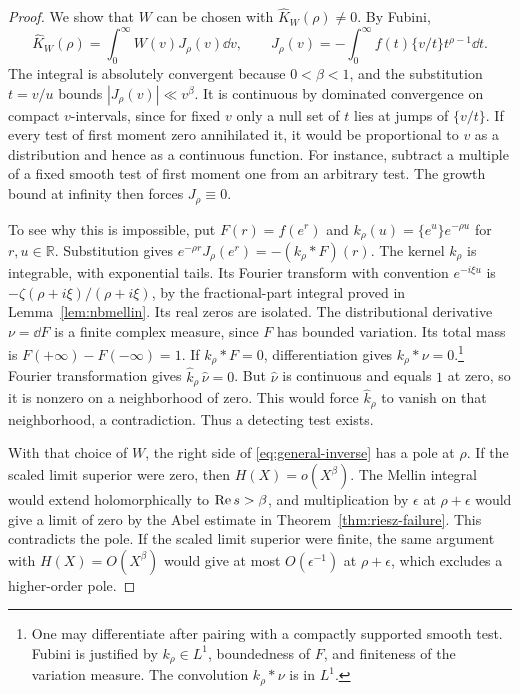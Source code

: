 \begin{proof}
We show that \(W\) can be chosen with \(\widehat K_W(\rho)\ne0\). By Fubini,
\[
 \widehat K_W(\rho)=\int_0^\infty W(v)J_\rho(v)\dd v,\qquad
 J_\rho(v)=-\int_0^\infty f(t)\{v/t\}t^{\rho-1}\dd t .
\]
The integral is absolutely convergent because \(0<\beta<1\), and the substitution \(t=v/u\) bounds \(|J_\rho(v)|\ll v^\beta\). It is continuous by dominated convergence on compact \(v\)-intervals, since for fixed \(v\) only a null set of \(t\) lies at jumps of \(\{v/t\}\). If every test of first moment zero annihilated it, it would be proportional to \(v\) as a distribution and hence as a continuous function. For instance, subtract a multiple of a fixed smooth test of first moment one from an arbitrary test. The growth bound at infinity then forces \(J_\rho\equiv0\).

To see why this is impossible, put \(F(r)=f(e^r)\) and \(k_\rho(u)=\{e^u\}e^{-\rho u}\) for \(r,u\in\mathbb R\). Substitution gives \(e^{-\rho r}J_\rho(e^r)=-(k_\rho*F)(r)\). The kernel \(k_\rho\) is integrable, with exponential tails. Its Fourier transform with convention \(e^{-i\xi u}\) is \(-\zeta(\rho+i\xi)/(\rho+i\xi)\), by the fractional-part integral proved in Lemma~\ref{lem:nbmellin}. Its real zeros are isolated. The distributional derivative \(\nu=\dd F\) is a finite complex measure, since \(F\) has bounded variation. Its total mass is \(F(+\infty)-F(-\infty)=1\). If \(k_\rho*F=0\), differentiation gives \(k_\rho*\nu=0\).\footnote{One may differentiate after pairing with a compactly supported smooth test. Fubini is justified by \(k_\rho\in L^1\), boundedness of \(F\), and finiteness of the variation measure. The convolution \(k_\rho*\nu\) is in \(L^1\).} Fourier transformation gives \(\widehat k_\rho\,\widehat\nu=0\). But \(\widehat\nu\) is continuous and equals \(1\) at zero, so it is nonzero on a neighborhood of zero. This would force \(\widehat k_\rho\) to vanish on that neighborhood, a contradiction. Thus a detecting test exists.

With that choice of \(W\), the right side of \eqref{eq:general-inverse} has a pole at \(\rho\). If the scaled limit superior were zero, then \(H(X)=o(X^\beta)\). The Mellin integral would extend holomorphically to \(\operatorname{Re} s>\beta\), and multiplication by \(\epsilon\) at \(\rho+\epsilon\) would give a limit of zero by the Abel estimate in Theorem~\ref{thm:riesz-failure}. This contradicts the pole. If the scaled limit superior were finite, the same argument with \(H(X)=O(X^\beta)\) would give at most \(O(\epsilon^{-1})\) at \(\rho+\epsilon\), which excludes a higher-order pole.
\end{proof}

